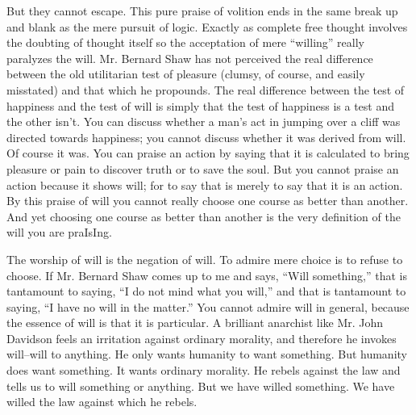 \documentclass{book}
\begin{document}
But they cannot escape. This pure praise of volition ends in the same break up and blank as the mere pursuit of logic. Exactly as complete free thought involves the doubting of thought itself so the acceptation of mere “willing” really paralyzes the will. Mr. Bernard Shaw has not perceived the real difference between the old utilitarian test of pleasure (clumsy, of course, and easily misstated) and that which he propounds. The real difference between the test of happiness and the test of will is simply that the test of happiness is a test and the other isn’t. You can discuss whether a man’s act in jumping over a cliff was directed towards happiness; you cannot discuss whether it was derived from will. Of course it was. You can praise an action by saying that it is calculated to bring pleasure or pain to discover truth or to save the soul. But you cannot praise an action because it shows will; for to say that is merely to say that it is an action. By this praise of will you cannot really choose one course as better than another. And yet choosing one course as better than another is the very definition of the will you are praIsIng.

The worship of will is the negation of will. To admire mere choice is to refuse to choose. If Mr. Bernard Shaw comes up to me and says, “Will something,” that is tantamount to saying, “I do not mind what you will,” and that is tantamount to saying, “I have no will in the matter.” You cannot admire will in general, because the essence of will is that it is particular. A brilliant anarchist like Mr. John Davidson feels an irritation against ordinary morality, and therefore he invokes will–will to anything. He only wants humanity to want something. But humanity does want something. It wants ordinary morality. He rebels against the law and tells us to will something or anything. But we have willed something. We have willed the law against which he rebels.
\end{document}
